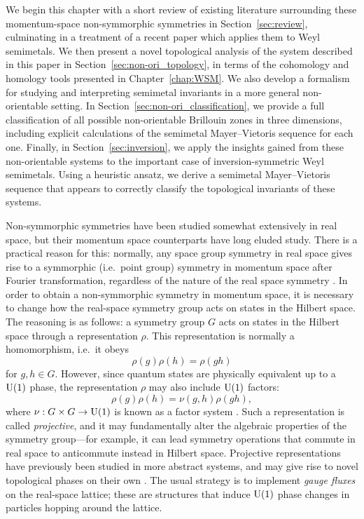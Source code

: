 We begin this chapter with a short review of existing literature surrounding these momentum-space non-symmorphic symmetries in Section~\ref{sec:review}, culminating in a treatment of a recent paper which applies them to Weyl semimetals. We then present a novel topological analysis of the system described in this paper in Section~\ref{sec:non-ori_topology}, in terms of the cohomology and homology tools presented in Chapter~\ref{chap:WSM}. We also develop a formalism for studying and interpreting semimetal invariants in a more general non-orientable setting. In Section~\ref{sec:non-ori_classification}, we provide a full classification of all possible non-orientable Brillouin zones in three dimensions, including explicit calculations of the semimetal Mayer--Vietoris sequence for each one. Finally, in Section~\ref{sec:inversion}, we apply the insights gained from these non-orientable systems to the important case of inversion-symmetric Weyl semimetals. Using a heuristic ansatz, we derive a semimetal Mayer--Vietoris sequence that appears to correctly classify the topological invariants of these systems.


\label{sec:review}

Non-symmorphic symmetries have been studied somewhat extensively in real space, but their momentum space counterparts have long eluded study. There is a practical reason for this: normally, any space group symmetry in real space gives rise to a symmorphic (i.e.\ point group) symmetry in momentum space after Fourier transformation, regardless of the nature of the real space symmetry \cite{Zhang_nonsymmorphic}. In order to obtain a non-symmorphic symmetry in momentum space, it is necessary to change how the real-space symmetry group acts on states in the Hilbert space. The reasoning is as follows: a symmetry group $G$ acts on states in the Hilbert space through a representation $\rho$. This representation is normally a homomorphism, i.e.\ it obeys
\begin{equation*}
	\rho(g)\rho(h) = \rho(gh)
\end{equation*}
for $g,h\in G$. However, since quantum states are physically equivalent up to a $\operatorname{U}(1)$ phase, the representation $\rho$ may also include $\operatorname{U}(1)$ factors:
\begin{equation*}
	\rho(g)\rho(h) = \nu(g,h)\rho(gh),
\end{equation*}
where $\nu: G\times G\to \operatorname{U}(1)$ is known as a factor system \cite{Chen_gauge-classification}. Such a representation is called \emph{projective}, and it may fundamentally alter the algebraic properties of the symmetry group---for example, it can lead symmetry operations that commute in real space to anticommute instead in Hilbert space. Projective representations have previously been studied in more abstract systems, and may give rise to novel topological phases on their own \cite{ZHY_Z2-projective,Zhao_projective-PT,Shao_gauge,Xue-Wang_acoustic-Mobius,Li-Du_acoustic-Mobius,Chen_gauge-classification}. The usual strategy is to implement \emph{gauge fluxes} on the real-space lattice; these are structures that induce $\operatorname{U}(1)$ phase changes in particles hopping around the lattice.

